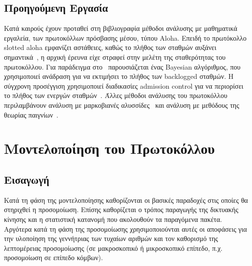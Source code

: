 \documentclass[12pt]{report}
\begin{document}
\section{Προηγούμενη Εργασία}
Κατά καιρούς έχουν προταθεί στη βιβλιογραφία μέθοδοι ανάλυσης με μαθηματικά εργαλεία, των πρωτοκόλλων πρόσβασης μέσου, τύπου \textlatin{Aloha}. Επειδή το πρωτόκολλο \textlatin{slotted aloha} εμφανίζει αστάθειες, καθώς το πλήθος των σταθμών αυξάνει σημαντικά~\cite{paper:07, paper:08}, η αρχική έρευνα είχε στραφεί στην μελέτη της σταθερότητας του πρωτοκόλλου. Για παράδειγμα στο~\cite{paper:09} παρουσιάζεται ένας \textlatin{Bayesian} αλγόριθμος, που χρησιμοποιεί ανάδραση για να εκτιμήσει το πλήθος των \textlatin{backlogged} σταθμών. Η σύγχρονη προσέγγιση χρησιμοποιεί διαδικασίες \textlatin{admission control} για να περιορίσει το πλήθος των ενεργών σταθμών~\cite{paper:07}. Άλλες μέθοδοι ανάλυσης του πρωτοκόλλου περιλαμβάνουν ανάλυση με μαρκοβιανές αλυσσίδες~\cite{paper:04, paper:05} και ανάλυση με μεθόδους της θεωρίας παιγνίων~\cite{paper:07, paper:10}.

\chapter{Μοντελοποίηση του Πρωτοκόλλου}\label{ch2}
\section{Εισαγωγή}
Κατά τη φάση της μοντελοποίησης καθορίζονται οι βασικές παραδοχές στις οποίες θα στηριχθεί η προσομοίωση. Επίσης καθορίζεται ο τρόπος παραγωγής της δικτυακής κίνησης και η στατιστική κατανομή που ακολουθούν τα παραγόμενα πακέτα. Αργότερα κατά τη φάση της προσομοίωσης χρησιμοποιούνται αυτές οι αποφάσεις για την υλοποίηση της γεννήτριας των τυχαίων αριθμών και τον καθορισμό της λεπτομέρειας προσομοίωσης (σε μακροσκοπικό ή μικροσκοπικό επίπεδο, π.χ. προσομοίωση σε επίπεδο κόμβων).
\end{document}
